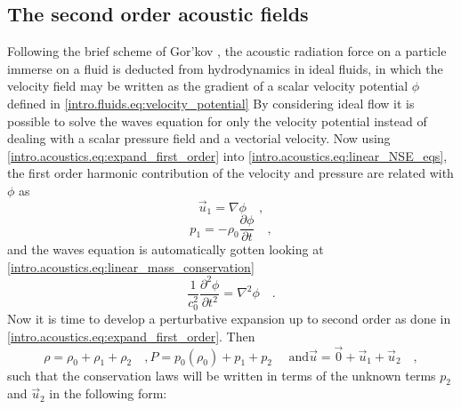 \subsection{The second order acoustic fields}
Following the brief scheme of Gor'kov \cite{Gorkov1962,Bruus2012_07,Manneberg2009}, the acoustic radiation force on a particle immerse on a fluid is deducted from hydrodynamics in ideal fluids, in which the velocity field may be written as the gradient of a scalar velocity potential $\phi$ defined in \ref{intro.fluids.eq:velocity_potential} By considering ideal flow it is possible to solve the waves equation for only the velocity potential instead of dealing with a scalar pressure field and a vectorial velocity. Now using \ref{intro.acoustics.eq:expand_first_order} into \ref{intro.acoustics.eq:linear_NSE_eqs}, the first order harmonic contribution of the velocity and pressure are related with $\phi$ as
\begin{equation}\label{intro.arf.eq:grad_phi_u1}
    \vec u_1 = \nabla\phi\quad,
\end{equation}
\begin{equation}\label{intro.arf.eq:time_phi}
    p_1 = -\rho_0\frac{\partial\phi}{\partial t}\quad,
\end{equation}
and the waves equation is automatically gotten looking at \ref{intro.acoustics.eq:linear_mass_conservation}
\begin{equation}\label{intro.arf.eq:potential_waves}
    \frac{1}{c_0^2}\frac{\partial^2\phi}{\partial t^2} = \nabla^2\phi\quad.
\end{equation}
Now it is time to develop a perturbative expansion up to second order as done in \ref{intro.acoustics.eq:expand_first_order}. Then
\begin{subequations}\label{intro.arf.eq:expand_second_order}
\begin{equation}\label{intro.arf.eq:expand_rho_second}
    \rho = \rho_0 + \rho_1 + \rho_2\quad,
\end{equation}
\begin{equation}\label{intro.arf.eq:expand_p_second}
    P = p_0(\rho_0) + p_1 + p_2\quad\text{ and}
\end{equation}    
\begin{equation}\label{intro.arf.eq:expand_u_second}
    \vec u = \vec 0 + \vec u_1 + \vec u_2\quad,
\end{equation}
\end{subequations}
such that the conservation laws will be written in terms of the unknown terms $p_2$ and $\vec u_2$ in the following form:
